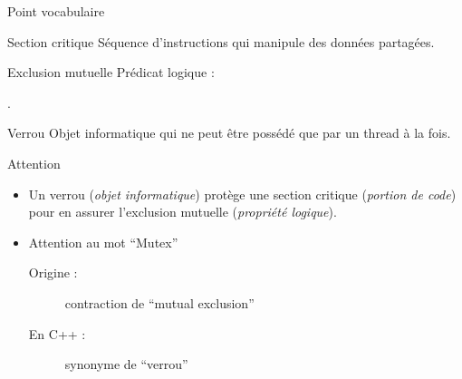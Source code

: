 
\begingroup

\begin{frame}[fragile]{Point vocabulaire}

  \vspace{-1mm}
  \begin{block}{Section critique}
    Séquence d'instructions qui manipule des données partagées.
  \end{block}

  \begin{block}{Exclusion mutuelle}
    Prédicat logique :
    \begin{center}
      \og {} \fg.
    \end{center}
  \end{block}

  \begin{block}{Verrou}
    Objet informatique qui ne peut être possédé que par un thread à la fois.
  \end{block}

  \begin{alertblock}{Attention}
    \begin{itemize}
    \item Un \alert{verrou} (\emph{objet informatique}) protège une
      \alert{section critique} (\emph{portion de code})
      pour en assurer l'\alert{exclusion mutuelle} (\emph{propriété logique}).
    \item Attention au mot ``Mutex''
      \begin{description}
      \item[Origine :] contraction de ``mutual exclusion''
      \item[En C++ :] synonyme de ``verrou''
      \end{description}
    \end{itemize}
  \end{alertblock}
  \vfill

\end{frame}

\endgroup
\endinput
